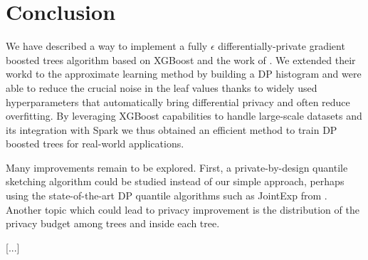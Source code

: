 \documentclass{article}
\theoremstyle{definition}
\begin{document}
\section{Conclusion} 

We have described a way to implement a fully $\epsilon$ differentially-private gradient boosted trees algorithm based on XGBoost and the work of \cite{li2020privacy}. We extended their workd to the approximate learning method by building a DP histogram and were able to reduce the crucial noise in the leaf values thanks to widely used hyperparameters that automatically bring differential privacy and often reduce overfitting. By leveraging XGBoost capabilities to handle large-scale datasets and its integration with Spark we thus obtained an efficient method to train DP boosted trees for real-world applications. \smallskip 

Many improvements remain to be explored. First, a private-by-design quantile sketching algorithm could be studied instead of our simple approach, perhaps using the state-of-the-art DP quantile algorithms such as JointExp from \cite{gillenwater2021}. Another topic which could lead to privacy improvement is the distribution of the privacy budget among trees and inside each tree. 

[...]
 


\end{document}
